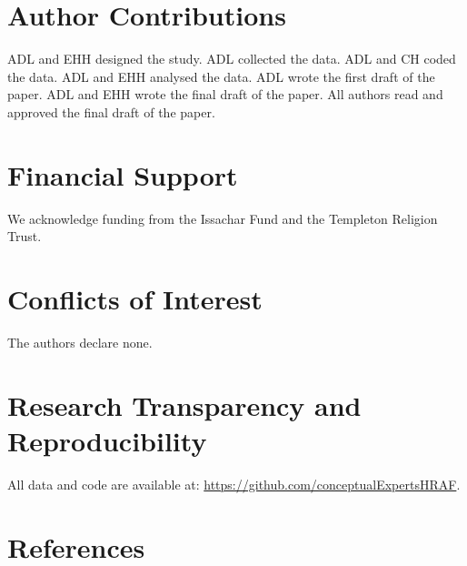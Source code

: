 \documentclass[
  11pt,
]{article}
\begin{document}
\hypertarget{author-contributions}{%
\section{Author Contributions}\label{author-contributions}}

ADL and EHH designed the study. ADL collected the data. ADL and CH coded the data. ADL and EHH analysed the data. ADL wrote the first draft of the paper. ADL and EHH wrote the final draft of the paper. All authors read and approved the final draft of the paper.

\hypertarget{financial-support}{%
\section{Financial Support}\label{financial-support}}

We acknowledge funding from the Issachar Fund and the Templeton Religion Trust.

\hypertarget{conflicts-of-interest}{%
\section{Conflicts of Interest}\label{conflicts-of-interest}}

The authors declare none.

\hypertarget{research-transparency-and-reproducibility}{%
\section{Research Transparency and Reproducibility}\label{research-transparency-and-reproducibility}}

All data and code are available at: \url{https://github.com/conceptualExpertsHRAF}.

\hypertarget{references}{%
\section*{References}\label{references}}
\end{document}
